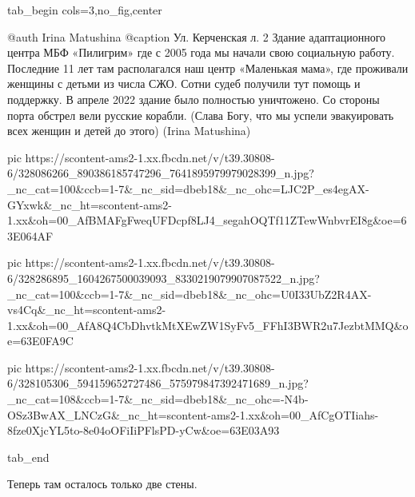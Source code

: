  
 
 
 
 

\begin{center}
\begin{minipage}{\textwidth}

\ifcmt
  tab_begin cols=3,no_fig,center

     @auth Irina Matushina
     @caption Ул. Керченская л. 2 Здание адаптационного центра МБФ «Пилигрим» где с 2005 года мы начали свою социальную работу. Последние 11 лет там располагался наш центр «Маленькая мама», где проживали женщины с детьми из числа СЖО. Сотни судеб получили тут помощь и поддержку. В апреле 2022 здание было полностью уничтожено. Со стороны порта обстрел вели русские корабли. (Слава Богу, что мы успели эвакуировать всех женщин и детей до этого) (Irina Matushina)

     pic https://scontent-ams2-1.xx.fbcdn.net/v/t39.30808-6/328086266_890386185747296_7641895979979028399_n.jpg?_nc_cat=100&ccb=1-7&_nc_sid=dbeb18&_nc_ohc=LJC2P_es4egAX-GYxwk&_nc_ht=scontent-ams2-1.xx&oh=00_AfBMAFgFweqUFDcpf8LJ4_segahOQTf11ZTewWnbvrEI8g&oe=63E064AF

     pic https://scontent-ams2-1.xx.fbcdn.net/v/t39.30808-6/328286895_1604267500039093_8330219079907087522_n.jpg?_nc_cat=100&ccb=1-7&_nc_sid=dbeb18&_nc_ohc=U0I33UbZ2R4AX-vs4Cq&_nc_ht=scontent-ams2-1.xx&oh=00_AfA8Q4CbDhvtkMtXEwZW1SyFv5_FFhI3BWR2u7JezbtMMQ&oe=63E0FA9C

     pic https://scontent-ams2-1.xx.fbcdn.net/v/t39.30808-6/328105306_594159652727486_575979847392471689_n.jpg?_nc_cat=108&ccb=1-7&_nc_sid=dbeb18&_nc_ohc=-N4b-OSz3BwAX_LNCzG&_nc_ht=scontent-ams2-1.xx&oh=00_AfCgOTIiahs-8fze0XjcYL5to-8e04oOFiIiPFlsPD-yCw&oe=63E03A93

  tab_end
\fi
\end{minipage}
\end{center}


Теперь там осталось только две стены.
